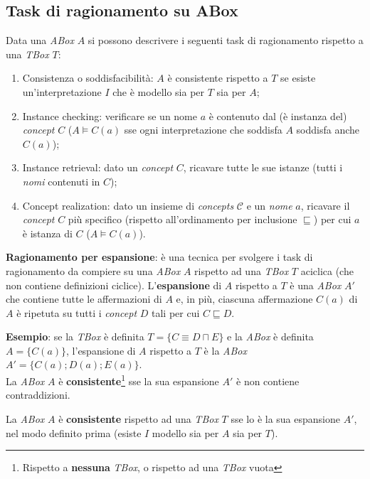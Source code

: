 \subsection{Task di ragionamento su ABox}
Data una \textit{ABox} $A$ si possono descrivere i seguenti task di ragionamento rispetto a una \textit{TBox} $T$:
\begin{enumerate}
\item Consistenza o soddisfacibilità: $A$ è consistente rispetto a $T$ se esiste un'interpretazione $I$ che è modello sia per $T$ sia per $A$;
\item Instance checking: verificare se un nome $a$ è contenuto dal (è instanza del) \textit{concept} $C$ ($A \models C(a)$ sse ogni interpretazione che soddisfa $A$ soddisfa anche $C(a)$);
\item Instance retrieval: dato un \textit{concept} $C$, ricavare tutte le sue istanze (tutti i \textit{nomi} contenuti in $C$);
\item Concept realization: dato un insieme di \textit{concepts} $\mathcal{C}$ e un \textit{nome} $a$, ricavare il \textit{concept} $C$ più specifico (rispetto all'ordinamento per inclusione $\sqsubseteq$) per cui $a$ è istanza di $C$ ($A \models C(a)$).
\end{enumerate}

\textbf{Ragionamento per espansione}: è una tecnica per svolgere i task di ragionamento da compiere su una \textit{ABox} $A$ rispetto ad una \textit{TBox} $T$ aciclica (che non contiene definizioni ciclice). L'\textbf{espansione} di $A$ rispetto a $T$ è una \textit{ABox} $A'$ che contiene tutte le affermazioni di $A$ e, in più, ciascuna affermazione $C(a)$ di $A$ è ripetuta su tutti i \textit{concept} $D$ tali per cui $C \sqsubseteq D$.

\textbf{Esempio}: se la \textit{TBox} è definita $T = \lbrace C \equiv D \sqcap E \rbrace$ e la \textit{ABox} è definita $A = \lbrace C(a) \rbrace$, l'espansione di $A$ rispetto a $T$ è la \textit{ABox} $A' = \lbrace C(a); D(a); E(a) \rbrace$.
\\

La \textit{ABox} $A$ è \textbf{consistente}\footnote{Rispetto a \textbf{nessuna} \textit{TBox}, o rispetto ad una \textit{TBox} vuota} sse la sua espansione $A'$ è non contiene contraddizioni.

La \textit{ABox} $A$ è \textbf{consistente} rispetto ad una \textit{TBox} $T$ sse lo è la sua espansione $A'$, nel modo definito prima (esiste $I$ modello sia per $A$ sia per $T$).

